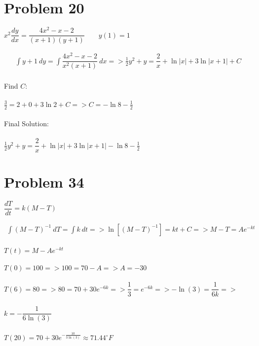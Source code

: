 \documentclass[12pt]{exam}
\begin{document}
\section*{Problem 20}
\begin{center}$x^2\dfrac{dy}{dx}=\dfrac{4x^2-x-2}{(x+1)(y+1)}\qquad y(1)=1$\end{center}
\large\begin{eqnarray*}
    \int y+1\:dy=\int\dfrac{4x^2-x-2}{x^2(x+1)}\:dx=>\frac{1}{2}y^2+y=\dfrac{2}{x}+\ln{|x|}+3\ln{|x+1|}+C
\end{eqnarray*}\\
Find $C$:\\\\
$\frac{3}{2}=2+0+3\ln{2}+C=>C=-\ln{8}-\frac{1}{2}$\\\\
Final Solution:\\\\
$\frac{1}{2}y^2+y=\dfrac{2}{x}+\ln{|x|}+3\ln{|x+1|}-\ln{8}-\frac{1}{2}$
\section*{Problem 34}
\begin{center}$\dfrac{dT}{dt}=k(M-T)$\end{center}
\large\begin{eqnarray*}
    \int(M-T)^{-1}\:dT=\int k\:dt=>\ln{\left[(M-T)^{-1}\right]}=kt+C=>M-T=
    Ae^{-kt}
\end{eqnarray*}\\
$T(t)=M-Ae^{-kt}$\\\\
$T(0)=100=>100=70-A=>A=-30$\\\\
$T(6)=80=>80=70+30e^{-6k}=>\dfrac{1}{3}=e^{-6k}=>-\ln{(3)}=\dfrac{1}{6k}=>$\\\\
$k=-\dfrac{1}{6\ln{(3)}}$\\\\
$T(20)=70+30e^{-\frac{10}{3\ln{(3)}}}\approx71.44^{\circ}F$
\end{document}
